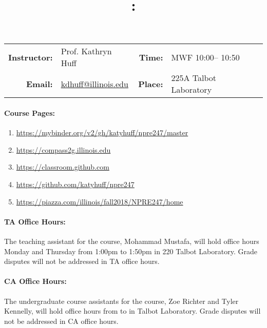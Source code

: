 \documentclass[11pt, a4paper]{article}
\title{\CourseNumber: \CourseTitle\\}
\author{\CourseUniversity}
\date{\CourseSemester \CourseYear}
\makeatletter
\newcommand{\CourseNumber}{NPRE247}
\newcommand{\CourseInstructor}{Prof. Kathryn Huff\xspace}%
\newcommand{\CourseDays}{MWF\xspace}%
\newcommand{\CourseStart}{10:00\xspace}%
\newcommand{\CourseEnd}{10:50\xspace}%
\newcommand{\CourseInstructorEmail}{kdhuff@illinois.edu}
\newcommand{\CourseRoom}{225A\xspace}%
\newcommand{\CourseBuilding}{Talbot Laboratory\xspace}%
\newcommand{\TeachingAssistant}{Mohammad Mustafa\xspace}%
\newcommand{\TAOfficeHourDays}{Monday and Thursday \xspace}%
\newcommand{\TAOfficeHourStart}{1:00pm\xspace}%
\newcommand{\TAOfficeHourEnd}{1:50pm\xspace}%
\newcommand{\TAOfficeHourPlace}{220 Talbot Laboratory\xspace}
\newcommand{\CourseAssistants}{Zoe Richter and Tyler Kennelly\xspace}%
\newcommand{\CAOfficeHourPlace}{ Talbot Laboratory\xspace}
\makeatother
\begin{document}
\maketitle
\renewcommand{\arraystretch}{1.5}
\begin{center}
\begin{table}[h]
\begin{tabularx}{\textwidth}{rXrX}
\hline
\textbf{Instructor:} & \CourseInstructor & \textbf{Time:} & \CourseDays \CourseStart -- \CourseEnd \\
\textbf{Email:} &  \href{mailto:\CourseInstructorEmail}{\CourseInstructorEmail} & \textbf{Place:} & \CourseRoom \CourseBuilding\\
\hline
\end{tabularx}
\end{table}
\end{center}

\paragraph{Course Pages:}
\begin{enumerate}
        \item \url{https://mybinder.org/v2/gh/katyhuff/npre247/master}
        \item \url{https://compass2g.illinois.edu}
        \item \url{https://classroom.github.com}
        \item \url{https://github.com/katyhuff/npre247}
        \item \url{https://piazza.com/illinois/fall2018/\CourseNumber/home}
\end{enumerate}

\paragraph{TA Office Hours:} The teaching assistant for the course, 
\TeachingAssistant, will hold office hours \TAOfficeHourDays from 
\TAOfficeHourStart to \TAOfficeHourEnd in \TAOfficeHourPlace. 
Grade disputes will not be addressed in TA office hours. 

\paragraph{CA Office Hours:} The undergraduate course assistants for the course, 
\CourseAssistants, will hold office hours \CAOfficeHourDays from 
\CAOfficeHourStart to \CAOfficeHourEnd in \CAOfficeHourPlace.
Grade disputes will not be addressed in CA office hours. 
\end{document}
